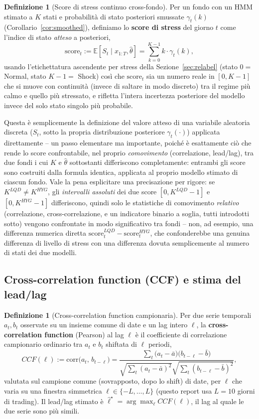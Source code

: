 \documentclass[11pt]{article}
\theoremstyle{definition}
\newtheorem{definition}[theorem]{Definizione}
\theoremstyle{remark}
\begin{document}
\begin{definition}[Score di stress continuo cross-fondo]
Per un fondo con un HMM stimato a $K$ stati e probabilit\`a di stato posteriori smussate $\gamma_t(k)$ (Corollario~\ref{cor:smoothed}), definiamo lo \textbf{score di stress} del giorno $t$ come l'indice di stato \emph{atteso} a posteriori,
\[
\mathrm{score}_t := \mathbb{E}[S_t\mid x_{1:T},\widehat\theta] = \sum_{k=0}^{K-1} k\cdot\gamma_t(k),
\]
usando l'etichettatura ascendente per stress della Sezione~\ref{sec:relabel} (stato $0=$ Normal, stato $K-1=$ Shock) cos\`i che $\mathrm{score}_t$ sia un numero reale in $[0,K-1]$ che si muove con continuit\`a (invece di saltare in modo discreto) tra il regime pi\`u calmo e quello pi\`u stressato, e rifletta l'intera incertezza posteriore del modello invece del solo stato singolo pi\`u probabile.
\end{definition}
Questa \`e semplicemente la definizione del valore atteso di una variabile aleatoria discreta ($S_t$, sotto la propria distribuzione posteriore $\gamma_t(\cdot)$) applicata direttamente -- un passo elementare ma importante, poich\'e \`e esattamente ci\`o che rende lo score confrontabile, nel proprio \emph{comovimento} (correlazione, lead/lag), tra due fondi i cui $K$ e $\widehat\theta$ sottostanti differiscono completamente: entrambi gli score sono costruiti dalla formula identica, applicata al proprio modello stimato di ciascun fondo. Vale la pena esplicitare una precisazione per rigore: se $K^{LQD}\ne K^{HYG}$, gli \emph{intervalli assoluti} dei due score $[0,K^{LQD}-1]$ e $[0,K^{HYG}-1]$ differiscono, quindi solo le statistiche di comovimento \emph{relativo} (correlazione, cross-correlazione, e un indicatore binario a soglia, tutti introdotti sotto) vengono confrontate in modo significativo tra fondi -- non, ad esempio, una differenza numerica diretta $\mathrm{score}_t^{LQD}-\mathrm{score}_t^{HYG}$, che confonderebbe una genuina differenza di livello di stress con una differenza dovuta semplicemente al numero di stati dei due modelli.

\subsection{Cross-correlation function (CCF) e stima del lead/lag}
\label{sec:ccf}

\begin{definition}[Cross-correlation function campionaria]
Per due serie temporali $a_t,b_t$ osservate su un insieme comune di date e un lag intero $\ell$, la \textbf{cross-correlation function} (Pearson) \cite{boxjenkins} al lag $\ell$ \`e il coefficiente di correlazione campionario ordinario tra $a_t$ e $b_t$ shiftata di $\ell$ periodi,
\[
CCF(\ell) := \mathrm{corr}\big(a_t,\,b_{t-\ell}\big) = \frac{\sum_t\big(a_t-\bar a\big)\big(b_{t-\ell}-\bar b\big)}{\sqrt{\sum_t(a_t-\bar a)^2}\sqrt{\sum_t(b_{t-\ell}-\bar b)^2}},
\]
valutata sul campione comune (sovrapposto, dopo lo shift) di date, per $\ell$ che varia su una finestra simmetrica $\ell\in\{-L,\dots,L\}$ (questo report usa $L=10$ giorni di trading). Il lead/lag stimato \`e $\widehat\ell^\star=\arg\max_\ell CCF(\ell)$, il lag al quale le due serie sono pi\`u simili.
\end{definition}
\end{document}
